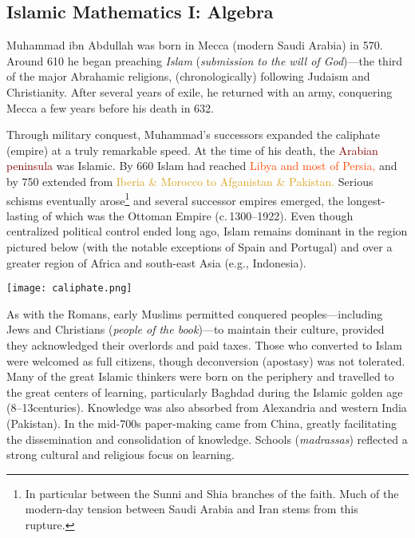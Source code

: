 \clearpage

\subsection{Islamic Mathematics I: Algebra}\label{sec:islamalgebra}

Muhammad ibn Abdullah was born in Mecca (modern Saudi Arabia) in 570. Around 610 he began preaching \emph{Islam} (\emph{submission to the will of God})---the third of the major Abrahamic religions, (chronologically) following Judaism and Christianity. After several years of exile, he returned with an army, conquering Mecca a few years before his death in 632.\smallbreak

Through military conquest, Muhammad's successors expanded the caliphate (empire) at a truly remarkable speed. At the time of his death, the \textcolor{Maroon}{Arabian peninsula} was Islamic. By 660 Islam had reached \textcolor{OrangeRed}{Libya and most of Persia,} and by 750 extended from \textcolor{Goldenrod}{Iberia \& Morocco to Afganistan \& Pakistan.} Serious schisms eventually arose\footnote{In particular between the Sunni and Shia branches of the faith. Much of the modern-day tension between Saudi Arabia and Iran stems from this rupture.} and several successor empires emerged, the longest-lasting of which was the Ottoman Empire (c.\,1300--1922). Even though centralized political control ended long ago, Islam remains dominant in the region pictured below (with the notable exceptions of Spain and Portugal) and over a greater region of Africa and south-east Asia (e.g., Indonesia).
\begin{center}
	\texttt{[image: caliphate.png]}
\end{center}

As with the Romans, early Muslims permitted conquered peoples---including Jews and Christians (\emph{people of the book})---to maintain their culture, provided they acknowledged their overlords and paid taxes. Those who converted to Islam were welcomed as full citizens, though deconversion (apostasy) was not tolerated. Many of the great Islamic thinkers were born on the periphery and travelled to the great centers of learning, particularly Baghdad during the Islamic golden age (8\th--13\th centuries). Knowledge was also absorbed from Alexandria and western India (Pakistan). In the mid-700s paper-making came from China, greatly facilitating the dissemination and consolidation of knowledge. Schools (\emph{madrassas}) reflected a strong cultural and religious focus on learning.\smallbreak

